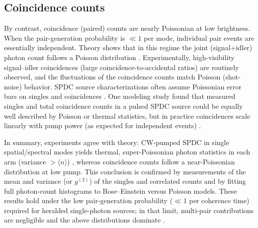 \subsection*{Coincidence counts}
By contrast, coincidence (paired) counts are nearly Poissonian at low brightness. When the pair-generation probability is $\ll1$ per mode, individual pair events are essentially independent. Theory shows that in this regime the joint (signal+idler) photon count follows a Poisson distribution \citep{Avenhaus2008,Christ2011}. Experimentally, high-visibility signal--idler coincidences (large coincidence-to-accidental ratios) are routinely observed, and the fluctuations of the coincidence counts match Poisson (shot-noise) behavior. SPDC source characterizations often assume Poissonian error bars on singles and coincidences \citep{Spring2013}. One modeling study found that measured singles and total coincidence counts in a pulsed SPDC source could be equally well described by Poisson or thermal statistics, but in practice coincidences scale linearly with pump power (as expected for independent events) \citep{Brida2006,Avenhaus2008}.

In summary, experiments agree with theory: CW-pumped SPDC in single spatial/spectral modes yields thermal, super-Poissonian photon statistics in each arm (variance $>\!\langle n\rangle$) \citep{Guo2017,Fang2023,Christ2011}, whereas coincidence counts follow a near-Poissonian distribution at low pump. This conclusion is confirmed by measurements of the mean and variance (or $g^{(2)}$) of the singles and correlated counts \citep{Guo2017,Fang2023,Christ2011} and by fitting full photon-count histograms to Bose--Einstein versus Poisson models. These results hold under the low pair-generation probability ($\ll1$ per coherence time) required for heralded single-photon sources; in that limit, multi-pair contributions are negligible and the above distributions dominate \citep{Avenhaus2008,Christ2011}.




